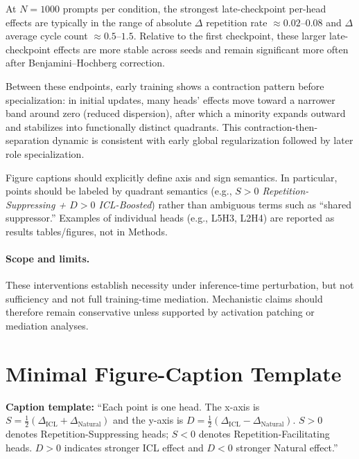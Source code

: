 \documentclass[11pt]{article}
\begin{document}
At $N=1000$ prompts per condition, the strongest late-checkpoint per-head effects are typically in the range of absolute $\Delta$ repetition rate $\approx 0.02$--$0.08$ and $\Delta$ average cycle count $\approx 0.5$--$1.5$. Relative to the first checkpoint, these larger late-checkpoint effects are more stable across seeds and remain significant more often after Benjamini--Hochberg correction.

Between these endpoints, early training shows a contraction pattern before specialization: in initial updates, many heads' effects move toward a narrower band around zero (reduced dispersion), after which a minority expands outward and stabilizes into functionally distinct quadrants. This contraction-then-separation dynamic is consistent with early global regularization followed by later role specialization.

Figure captions should explicitly define axis and sign semantics. In particular, points should be labeled by quadrant semantics (e.g., \textit{$S>0$ Repetition-Suppressing + $D>0$ ICL-Boosted}) rather than ambiguous terms such as ``shared suppressor.'' Examples of individual heads (e.g., L5H3, L2H4) are reported as results tables/figures, not in Methods.

\paragraph{Scope and limits.}
These interventions establish necessity under inference-time perturbation, but not sufficiency and not full training-time mediation. Mechanistic claims should therefore remain conservative unless supported by activation patching or mediation analyses.

\section{Minimal Figure-Caption Template}
\noindent
\textbf{Caption template:} ``Each point is one head. The x-axis is $S=\frac{1}{2}(\Delta_{\mathrm{ICL}}+\Delta_{\mathrm{Natural}})$ and the y-axis is $D=\frac{1}{2}(\Delta_{\mathrm{ICL}}-\Delta_{\mathrm{Natural}})$. $S>0$ denotes Repetition-Suppressing heads; $S<0$ denotes Repetition-Facilitating heads. $D>0$ indicates stronger ICL effect and $D<0$ stronger Natural effect.''
\end{document}
